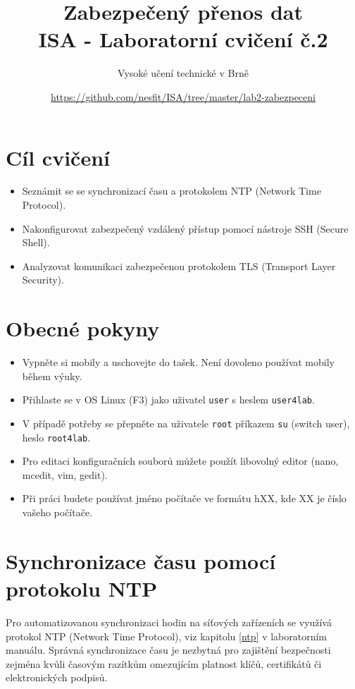 \documentclass[a4paper,11pt]{article}
\title{Zabezpečený přenos dat\\
{\bf\large ISA - Laboratorní cvičení č.2}}
\author{Vysoké učení technické v Brně}
\date{\url{https://github.com/nesfit/ISA/tree/master/lab2-zabezpeceni}}
\begin{document}
{\let\newpage\relax\maketitle}

\section*{Cíl cvičení}
\begin{itemize}
  \item Seznámit se se synchronizací času a protokolem NTP (Network Time Protocol).
  \item Nakonfigurovat zabezpečený vzdálený přístup pomocí nástroje SSH (Secure Shell).
  \item Analyzovat komunikaci zabezpečenou protokolem TLS (Transport Layer Security).
\end{itemize}

\section*{Obecné pokyny}
\begin{itemize}
  \item Vypněte si mobily a uschovejte do tašek. Není dovoleno používat mobily během výuky. 
  \item Přihlaste se v OS Linux (F3) jako uživatel {\tt user} s heslem {\tt user4lab}.
  \item V případě potřeby se přepněte na uživatele {\tt root} příkazem {\tt su}
  (switch user), heslo {\tt root4lab}.
  \item Pro editaci konfiguračních souborů můžete použít libovolný editor (nano, mcedit, vim, gedit).
  \item Při práci budete používat jméno počítače ve formátu hXX, kde XX je číslo vašeho počítače.
\end{itemize}

\section{Synchronizace času pomocí protokolu NTP}
Pro automatizovanou synchronizaci hodin na síťových zařízeních se využívá protokol NTP (Network Time Protocol), viz kapitolu \ref{ntp} v laboratorním manuálu. Správná synchronizace  času je nezbytná pro zajištění bezpečnosti zejména kvůli časovým razítkům omezujícím platnost klíčů, certifikátů či elektronických podpisů.
\end{document}

